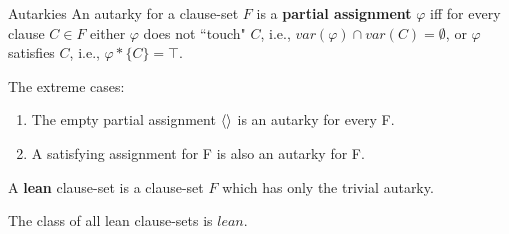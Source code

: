 \documentclass[xcolor=table	]{beamer}
\DeclarePairedDelimiter\ev{\langle}{\rangle}%
\begin{document}
%
% 
% 
%
% 

\begin{frame}{Autarkies}
An autarky for a clause-set $F$ is a \textbf{partial assignment} $\varphi$ iff for every clause $C \in F$ either $\varphi$ does not ``touch" $C$, i.e., $var(\varphi) \cap var(C) = \emptyset$, \newline or $\varphi$ satisfies $C$, i.e., $\varphi \ast \{C\} = \top$.\newline

\begin{figure}[h!]
	\centering
	\label{fig:coffee}
\end{figure}
%
\end{frame}

\begin{frame}{}
The extreme cases:
\begin{enumerate}
	\item The empty partial assignment $\ev{}$ is an autarky for every F.
	
	\item A satisfying assignment for F is also an autarky for F. \newline
\end{enumerate}

A \textbf{lean} clause-set is a clause-set $F$ which has
only the trivial autarky. \newline 

The class of all lean clause-sets is $lean$.

\end{frame}
\end{document}

